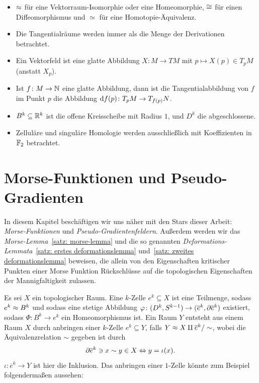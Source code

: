 \documentclass[a4paper,11pt,twoside]{scrreport}
\begin{document}
\begin{itemize}
    \item $\approx$ für eine Vektorraum-Isomorphie oder eine Homeomorphie, $\cong$ für einen Diffeomorphismus
        und $\simeq$ für eine Homotopie-Äquivalenz.
    \item Die Tangentialräume werden immer als die Menge der Derivationen betrachtet.
    \item Ein Vektorfeld ist eine glatte Abbildung $X \colon M \to TM$ mit 
        $p \mapsto X(p) \in T_pM$ (anstatt $X_p$).
    \item Ist $f \colon M \to { \mathbb N }$ eine glatte Abbildung, dann ist die Tangentialabbildung
        von $f$ im Punkt $p$ die Abbildung ${ \operatorname{d} } f (p) \colon T_pM \to T_{f(p)}N$.
    \item $B^k \subseteq { \mathbb R }^k$ ist die offene Kreisscheibe mit Radius $1$, und $D^k$
        die abgeschlossene.
    \item Zelluläre und singuläre Homologie werden ausschließlich mit Koeffizienten in ${ \mathbb F }_2$ betrachtet.
\end{itemize}

\tableofcontents

\cleardoublepage

\chapter{Morse-Funktionen und Pseudo-Gradienten}

\makeheaderfancy
\setcounter{page}{1}

In diesem Kapitel beschäftigen wir uns näher mit den Stars dieser Arbeit: \\
\textit{Morse-Funktionen} und \textit{Pseudo-Gradientenfeldern}. Außerdem werden wir das 
\textit{Morse-Lem\-ma}~\ref{satz: morse-lemma} und die so genannten 
\textit{Deformations-Lemmata}~\ref{satz: erstes deformationslemma} und~\ref{satz: zweites deformationslemma} 
beweisen, die allein von den Eigenschaften kritischer Punkten einer Morse Funktion 
Rückschlüsse auf die topologischen Eigenschaften der Mannigfaltigkeit zulassen.

Es sei $X$ ein topologischer Raum. Eine $k$-Zelle $e^k \subseteq X$ ist eine Teilmenge, sodass 
$e^k \approx B^k$ und sodass eine stetige Abbildung 
$\varphi \colon (D^k, S^{k - 1}) \to (\overline{e}^k, { \partial } \overline{e}^k)$ existiert, sodass 
$\Phi \colon B^k \to e^k$ ein Homeomorphismus ist. Ein Raum $Y$ entsteht aus einem Raum $X$
durch anbringen einer $k$-Zelle $e^k \subseteq Y$, falls $Y \approx X \amalg \overline{e}^k / \sim$, 
wobei die Äquivalenzrelation $\sim$ gegeben ist durch 
\[ { \partial } \overline{e}^k \ni x \sim y \in X \Leftrightarrow y = \iota (x) . \]
$\iota \colon \overline{e}^k \to Y$ ist hier die Inklusion. Das anbringen einer $1$-Zelle könnte 
zum Beispiel folgendermaßen aussehen:
\end{document}
